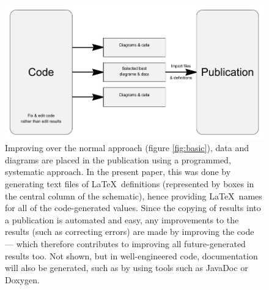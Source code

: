 \documentclass[10pt,a4paper]{article}
\begin{document}
\begin{figure} 
   \centering
   \includegraphics[width=5in]{generated/import.pdf} 
   \caption{Improving over the normal approach (figure \ref{fig:basic}), data and diagrams are placed in the publication using a programmed, systematic approach. In the present paper, this was done by generating text files of \LaTeX\ definitions (represented by boxes in the central column of the schematic), hence providing \LaTeX\ names for all of the code-generated values. Since the copying of results into a publication is automated and easy, any improvements to the results (such as correcting errors) are made by improving the code --- which therefore contributes to improving all future-generated results too. Not shown, but in well-engineered code, documentation will also be generated, such as by using tools such as JavaDoc or Doxygen.}
   \label{fig:rap}
\end{figure}
\end{document}
